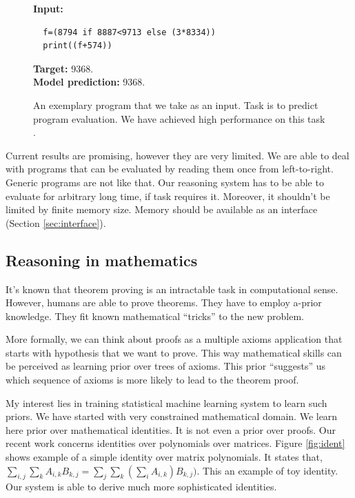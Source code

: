 \documentclass{article}
\begin{document}
\begin{figure}
  \begin{code}
  \begin{mdframed}
  {\bf Input:}
  \begin{lstlisting}
  f=(8794 if 8887<9713 else (3*8334))
  print((f+574))
  \end{lstlisting} 
  {\bf Target:} 9368. \\
  {\bf Model prediction:} 9368. 
  \end{mdframed}
  \end{code}
  \caption{An exemplary program that we take as an input. Task is to predict program evaluation. We have 
  achieved high performance on this task \cite{zaremba2014execute}.}
  \label{fig:prog}
\end{figure}


Current results are promising, however they are very limited. We are able to deal with programs
that can be evaluated by reading them once from left-to-right. Generic programs are not like that.
Our reasoning system has to be able to evaluate for arbitrary long time, if
task requires it. Moreover, it shouldn't be limited by finite memory size. Memory should be available
as an interface (Section \ref{sec:interface}).


\subsection{Reasoning in mathematics}
It's known that theorem proving is an intractable task in computational sense. 
However, humans are able to prove theorems. They have to employ a-prior
knowledge. They fit known mathematical ``tricks'' to the new problem.


More formally, we can think about proofs as a multiple axioms application that starts with
hypothesis that we want to prove. This way mathematical skills can be perceived as 
learning prior over trees of axioms. This prior ``suggests'' us which sequence of axioms is more
likely to lead to the theorem proof. 


My interest lies in training statistical machine learning system to learn such priors. 
We have started with very constrained mathematical domain. 
We learn here prior over mathematical identities. It is not even a prior over proofs.
Our recent work \cite{zaremba2014learning} concerns identities 
over polynomials over matrices. Figure \ref{fig:ident} shows example of a simple identity
over matrix polynomials. It states that, $\sum_{i,j} \sum_k A_{i, k}B_{k, j} = 
\sum_{j} \sum_k (\sum_i A_{i, k})B_{k, j})$. This an example of toy identity. Our system is able
to derive much more sophisticated identities.
\end{document}
